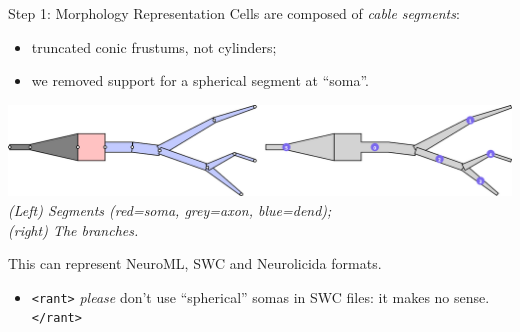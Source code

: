 \documentclass[aspectratio=43]{beamer}
\begin{document}
\begin{frame}[fragile]{Step 1: Morphology Representation}
    Cells are composed of \emph{cable segments}:
    \begin{itemize}
        \item truncated conic frustums, not cylinders;
        \item we removed support for a spherical segment at ``soma''.
    \end{itemize}

    \begin{center}
        \includegraphics[width=\textwidth]{./morphos/morphlab.png}
        \\
        \small \textit{(Left) Segments (red=soma, grey=axon, blue=dend);\\(right) The branches.}
    \end{center}

    This can represent NeuroML, SWC and Neurolicida formats.
    \begin{itemize}
        \item \texttt{<rant>} \textit{please} don't use ``spherical'' somas in SWC files: it makes no sense. \texttt{</rant>}
    \end{itemize}

\end{frame}
\end{document}
